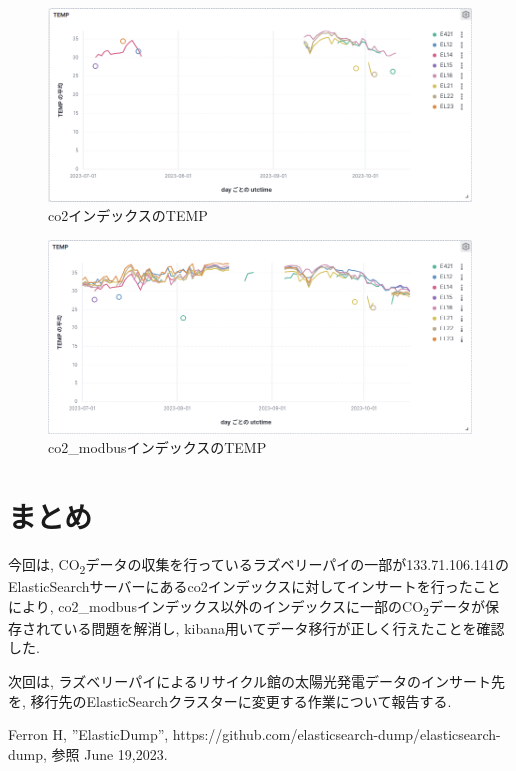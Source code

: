 \documentclass[a4j,12pt,]{jarticle}
\begin{document}
\begin{figure}[H]
  \begin{center}
    \includegraphics[width=160mm]{co2Temp.png}
    \caption{co2インデックスのTEMP}
    \label{p6}
  \end{center}
\end{figure}

\begin{figure}[H]
  \begin{center}
    \includegraphics[width=160mm]{co2ModbusTemp.png}
    \caption{co2\_modbusインデックスのTEMP}
    \label{p7}
  \end{center}
\end{figure}

\section{まとめ}
今回は, CO\textsubscript{2}データの収集を行っているラズベリーパイの一部が133.71.106.141のElasticSearchサーバーにあるco2インデックスに対してインサートを行ったことにより, co2\_modbusインデックス以外のインデックスに一部のCO\textsubscript{2}データが保存されている問題を解消し, kibana用いてデータ移行が正しく行えたことを確認した.

次回は, ラズベリーパイによるリサイクル館の太陽光発電データのインサート先を, 移行先のElasticSearchクラスターに変更する作業について報告する.

\begin{thebibliography}{5}
  Ferron H, ”ElasticDump”, https://github.com/elasticsearch-dump/elasticsearch-dump, 参照 June 19,2023.
\end{thebibliography}
\end{document}
